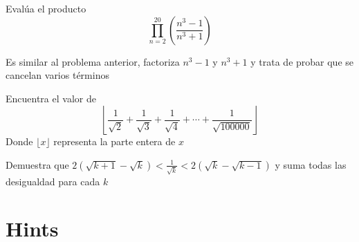 \documentclass[11pt]{scrartcl}
\begin{document}
    \begin{problem}
        Evalúa el producto
        \[\prod_{n=2}^{20} \left(\frac{n^3-1}{n^3+1}\right)\]
        \begin{hint}
            Es similar al problema anterior, factoriza $n^3-1$ y $n^3+1$ y trata de probar que se cancelan varios términos
        \end{hint}
    \end{problem}\hspace{0.2cm}
    
\begin{problem}
    Encuentra el valor de \[\left \lfloor \frac{1}{\sqrt{2}}+\frac{1}{\sqrt{3}}+\frac{1}{\sqrt{4}}+\cdots+\frac{1}{\sqrt{100000}}\right \rfloor\]
    Donde $\lfloor x\rfloor$ representa la parte entera de $x$
    \begin{hint}
        Demuestra que $2(\sqrt{k+1}-\sqrt{k})<\frac{1}{\sqrt{k}}<2(\sqrt{k}-\sqrt{k-1})$ y suma todas las desigualdad para cada $k$
    \end{hint}
\end{problem}
\bigskip
\clearpage
\section{Hints}
\begin{enumerate}
  
\end{enumerate}
\end{document}
